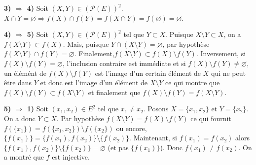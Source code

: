 {\begin{enumerate}
{\textbf{3) $\Rightarrow$ 4)} Soit $(X,Y)\in(\mathcal{P}(E))^2$. $X\cap Y=\varnothing\Rightarrow f(X)\cap f(Y)=f(X\cap
Y)=f(\varnothing)=\varnothing$.

\textbf{4) $\Rightarrow$ 5)} Soit $(X,Y)\in(\mathcal{P}(E))^2$ tel que $Y\subset X$.
Puisque $X\setminus Y\subset X$, on a $f(X\setminus Y)\subset f(X)$. Mais, puisque $Y\cap(X\setminus Y)=\varnothing$, par
hypothèse $f(X\setminus Y)\cap f(Y)=\varnothing$. Finalement,$f(X\setminus Y)\subset f(X)\setminus f(Y)$.
Inversement, si $f(X)\setminus f(Y)=\varnothing$, l'inclusion contraire est immédiate et si $f(X)\setminus
f(Y)\neq\varnothing$, un élémént de $f(X)\setminus f(Y)$ est l'image d'un certain élément de $X$ qui ne peut être dans $Y$
et donc est l'image d'un élément de $X\setminus Y$ ce qui montre que $f(X)\setminus f(Y)\subset f(X\setminus Y)$ et
finalement que $f(X)\setminus f(Y)=f(X\setminus Y)$.

\textbf{5) $\Rightarrow$ 1)} Soit $(x_1,x_2)\in E^2$ tel que $x_1\neq x_2$. Posons $X=\{x_1,x_2\}$ et $Y=\{x_2\}$.
On a
donc $Y\subset X$. Par hypothèse $f(X\setminus Y)=f(X)\setminus f(Y)$ ce qui fournit
$f(\{x_1\})=f(\{x_1,x_2\})\setminus f(\{x_2\})$ ou encore, $\{f(x_1)\}=\{f(x_1),f(x_2)\}\setminus\{f(x_2)\}$.
Maintenant, si $f(x_1)=f(x_2)$ alors $\{f(x_1),f(x_2)\}\setminus\{f(x_2)\}=\varnothing$ (et pas $\{f(x_1)\}$). Donc
$f(x_1)\neq f(x_2)$.
On a montré que $f$ est injective.
}
\end{enumerate}
}
